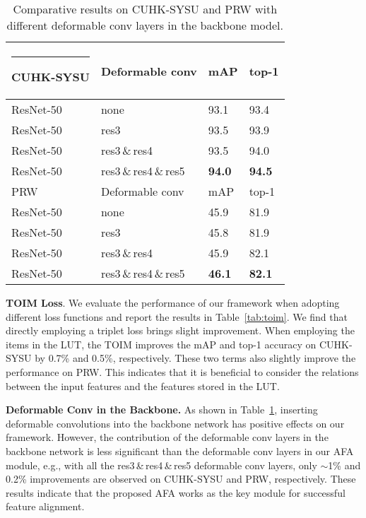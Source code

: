 \documentclass[journal]{IEEEtran}
\makeatletter
\newcommand{\thickhline}{\noalign {\ifnum 0=`}\fi \hrule height 1pt
    \futurelet \reserved@a \@xhline
}
\makeatother
\begin{document}
\begin{table}[t]
\small
\centering
\begin{tabular}{p{1.9cm}|p{2.7cm}|p{1.1cm}<{\centering}p{1.1cm}<{\centering}}
\hline\thickhline
\rowcolor{mygray} 
{CUHK-SYSU}  & Deformable conv   &  mAP  &  top-1  \\  \hline \hline     
ResNet-50
   & none       & 93.1   & 93.4  \\
ResNet-50
   & res3      & 93.5   & 93.9  \\
ResNet-50
   & res3{\,}\&{\,}res4      & 93.5   & 94.0  \\
ResNet-50
   & res3{\,}\&{\,}res4{\,}\&{\,}res5     &\textbf{94.0} & \textbf{94.5} \\
\hline \hline
\rowcolor{mygray} 
{PRW}  & Deformable conv   &  mAP  &  top-1  \\  \hline \hline     
ResNet-50
   & none       & 45.9   & 81.9  \\
ResNet-50
   & res3      & 45.8  & 81.9  \\
ResNet-50
   & res3{\,}\&{\,}res4      & 45.9   & 82.1  \\
ResNet-50
   & res3{\,}\&{\,}res4{\,}\&{\,}res5     &\textbf{46.1} & \textbf{82.1} \\
\hline
\end{tabular}
\caption{Comparative results on CUHK-SYSU and PRW with different deformable conv layers in the backbone model. }
\label{tab:dcn}
\end{table}

\textbf{TOIM Loss}.
We evaluate the performance of our framework when adopting different loss functions and report the results in Table~\ref{tab:toim}. We find that directly employing a triplet loss brings slight improvement. When employing the items in the LUT, the TOIM improves the mAP and top-1 accuracy on CUHK-SYSU by 0.7\% and 0.5\%, respectively. These two terms also slightly improve the performance on PRW. This indicates that it is beneficial to consider the relations between the input features and the features stored in the LUT.



\textbf{Deformable Conv in the Backbone.}
As shown in Table~\ref{tab:dcn}, inserting deformable convolutions into the backbone network has positive effects on our framework. However, the contribution of the deformable conv layers in the backbone network is less significant than the deformable conv layers in our AFA module, e.g., with all the res3{\,}\&{\,}res4{\,}\&{\,}res5 deformable conv layers, only $\sim$1\% and 0.2\% improvements are observed on CUHK-SYSU and PRW, respectively. These results indicate that the proposed AFA works as the key module for successful feature alignment.
\end{document}

